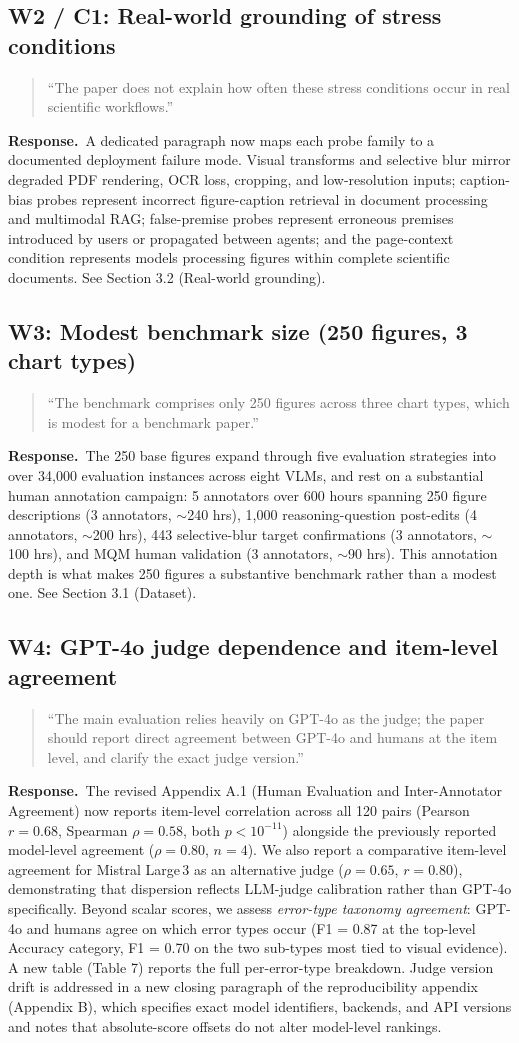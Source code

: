 \documentclass[11pt]{article}
\newcommand{\revsec}[1]{\textcolor{revisiongreen}{#1}}
\newenvironment{reviewercomment}{%
  \begin{quote}\small\itshape
}{%
  \end{quote}
}
\newcommand{\response}{\noindent\textbf{Response.}~}
\newcommand{\revisionitem}[3]{%
  \subsection{#1}
  \begin{reviewercomment}
  ``#2''
  \end{reviewercomment}
  \response #3\par
}
\begin{document}
\revisionitem
{W2 / C1: Real-world grounding of stress conditions}
{The paper does not explain how often these stress conditions occur in real scientific workflows.}
{A dedicated paragraph now maps each probe family to a documented deployment failure mode. Visual transforms and selective blur mirror degraded PDF rendering, OCR loss, cropping, and low-resolution inputs; caption-bias probes represent incorrect figure-caption retrieval in document processing and multimodal RAG; false-premise probes represent erroneous premises introduced by users or propagated between agents; and the page-context condition represents models processing figures within complete scientific documents. See \revsec{Section 3.2 (Real-world grounding)}.}

\revisionitem
{W3: Modest benchmark size (250 figures, 3 chart types)}
{The benchmark comprises only 250 figures across three chart types, which is modest for a benchmark paper.}
{The 250 base figures expand through five evaluation strategies into over 34{,}000 evaluation instances across eight VLMs, and rest on a substantial human annotation campaign: 5 annotators over 600 hours spanning 250 figure descriptions (3 annotators, $\sim$240 hrs), 1{,}000 reasoning-question post-edits (4 annotators, $\sim$200 hrs), 443 selective-blur target confirmations (3 annotators, $\sim$100 hrs), and MQM human validation (3 annotators, $\sim$90 hrs). This annotation depth is what makes 250 figures a substantive benchmark rather than a modest one. See \revsec{Section 3.1 (Dataset)}.}

\revisionitem
{W4: GPT-4o judge dependence and item-level agreement}
{The main evaluation relies heavily on GPT-4o as the judge; the paper should report direct agreement between GPT-4o and humans at the item level, and clarify the exact judge version.}
{The revised \revsec{Appendix A.1 (Human Evaluation and Inter-Annotator Agreement)} now reports item-level correlation across all 120 pairs (Pearson $r = 0.68$, Spearman $\rho = 0.58$, both $p < 10^{-11}$) alongside the previously reported model-level agreement ($\rho = 0.80$, $n = 4$). We also report a comparative item-level agreement for Mistral Large\,3 as an alternative judge ($\rho = 0.65$, $r = 0.80$), demonstrating that dispersion reflects LLM-judge calibration rather than GPT-4o specifically. Beyond scalar scores, we assess \emph{error-type taxonomy agreement}: GPT-4o and humans agree on which error types occur (F1 = 0.87 at the top-level Accuracy category, F1 = 0.70 on the two sub-types most tied to visual evidence). A new table (\revsec{Table 7}) reports the full per-error-type breakdown. Judge version drift is addressed in a new closing paragraph of the reproducibility appendix (\revsec{Appendix B}), which specifies exact model identifiers, backends, and API versions and notes that absolute-score offsets do not alter model-level rankings.}
\end{document}
